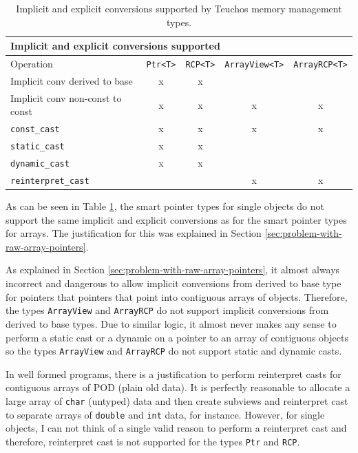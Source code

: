 \documentclass[pdf,ps2pdf,11pt]{SANDreport}
\begin{document}
\begin{table}
\begin{center}
\begin{tabular}{|l|c|c|c|c|}
\multicolumn{5}{l}{\textbf{Implicit and explicit conversions supported}} \\
\hline
Operation
& \texttt{Ptr<T>}
& \texttt{RCP<T>}
& \texttt{ArrayView<T>}
& \texttt{ArrayRCP<T>} \\
\hline
\hline
Implicit conv derived to base
& x
& x
& 
&  \\
\hline
Implicit conv non-const to const
& x
& x
& x
& x \\
\hline
{}\texttt{const\_cast}
& x
& x
& x
& x \\
\hline
{}\texttt{static\_cast}
& x
& x
& 
&  \\
\hline
{}\texttt{dynamic\_cast}
& x
& x 
& 
&  \\
\hline
{}\texttt{reinterpret\_cast}
& 
& 
& x
& x \\
\hline
\end{tabular}
\end{center}
\caption{\label{tbl:implicit_explicit_conversions}
Implicit and explicit conversions supported by Teuchos memory
management types.}
\end{table}

As can be seen in Table {}\ref{tbl:implicit_explicit_conversions},
the smart pointer types for single objects do not support the same
implicit and explicit conversions as for the smart pointer types for
arrays.  The justification for this was explained in Section
{}\ref{sec:problem-with-raw-array-pointers}.

As explained in Section {}\ref{sec:problem-with-raw-array-pointers},
it almost always incorrect and dangerous to allow implicit conversions
from derived to base type for pointers that pointers that point into
contiguous arrays of objects.  Therefore, the types
{}\texttt{ArrayView} and {}\texttt{ArrayRCP} do not support implicit
conversions from derived to base types.  Due to similar logic, it
almost never makes any sense to perform a static cast or a dynamic on
a pointer to an array of contiguous objects so the types
{}\texttt{ArrayView} and {}\texttt{ArrayRCP} do not support static and
dynamic casts.

In well formed programs, there is a justification to perform
reinterpret casts for contiguous arrays of POD (plain old data). It is
perfectly reasonable to allocate a large array of {}\texttt{char}
(untyped) data and then create subviews and reinterpret cast to
separate arrays of {}\texttt{double} and {}\texttt{int} data, for
instance.  However, for single objects, I can not think of a single
valid reason to perform a reinterpret cast and therefore, reinterpret
cast is not supported for the types {}\texttt{Ptr} and {}\texttt{RCP}.
\end{document}
